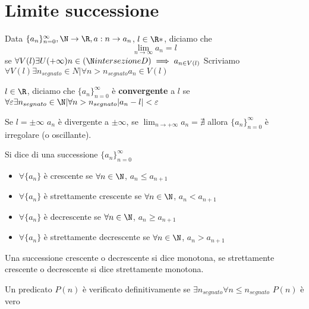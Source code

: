
\section{Limite successione}

Data $ \{a_{n} \}_{n=0}^\infty, \N \to \R, a: n\to a_{n}  $, $l \in \R*$, diciamo che 
\[
    \lim_{n\to\infty}a_{n}=l  
\]
se $\forall V(l) \exists U(+\infty) n \in(\N intersezione D) \implies a_{n \in V(l)}$
Scriviamo $\forall V(l) \exists n_{segnato} \in N | \forall n>n_{segnato} a_{n} \in V(l)$

$l\in \R$, diciamo che $ \{a_{n} \}_{n=0}^\infty $ è \textbf{convergente} a $ l $ se $ \forall \varepsilon \exists n_{segnato} \in \N | \forall n>n_{segnato} |a_{n} -l |<\varepsilon  $

Se $ l=\pm \infty $ $a_{n}$ è divergente a $ \pm\infty $, se $ \lim_{n\to+\infty} a_{n}=\nexists $ allora $ \{a_{n}\}_{n=0 }^\infty$ è irregolare (o oscillante).



Si dice di una successione $\{a_{n} \}_{n=0}^\infty$

\begin{itemize}
    \item $\forall \{a_{n} \}$ è crescente se $ \forall n \in \N $, $ a_{n} \le a_{n+1}  $
    \item $\forall\{a_{n} \}$ è strettamente crescente se $ \forall n \in \N $, $ a_{n} < a_{n+1}  $
    \item $\forall\{a_{n} \}$ è decrescente se $ \forall n \in \N $, $ a_{n} \ge a_{n+1}  $
    \item $\forall \{a_{n} \}$ è strettamente decrescente se $ \forall n \in \N $, $ a_{n} > a_{n+1}  $
\end{itemize}
Una successione crescente o decrescente si dice monotona, se strettamente crescente o decrescente si dice strettamente monotona.

Un predicato $ P(n) $ è verificato definitivamente se $ \exists n_{segnato} \forall n\le n_{segnato}$ $ P(n) $  è vero


